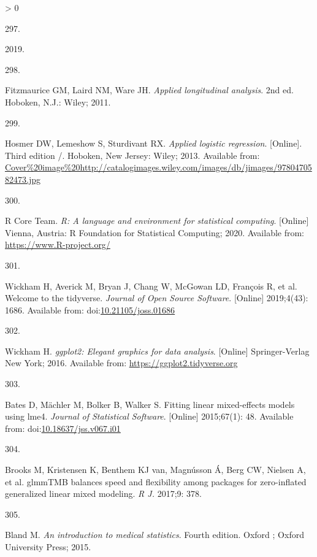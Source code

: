 \documentclass[twoside,10pt]{gihclass} %
\newlength{\cslhangindent}
\newlength{\csllabelwidth}
\newenvironment{CSLReferences}[3] %
 {%
  \setlength{\parindent}{0pt}
  \ifodd #1 \everypar{\setlength{\hangindent}{\cslhangindent}}\ignorespaces\fi
  \ifnum #2 > 0
  \setlength{\parskip}{#2\baselineskip}
  \fi
 }%
 {}
\newcommand{\CSLLeftMargin}[1]{\parbox[t]{\maxof{\widthof{#1}}{\csllabelwidth}}{#1}}
\newcommand{\CSLRightInline}[1]{\parbox[t]{\linewidth}{#1}}
\begin{document}
\begin{CSLReferences}{0}{0}
\leavevmode\hypertarget{ref-RN2822}{}%
\CSLLeftMargin{297. }
\CSLRightInline{2019. }

\leavevmode\hypertarget{ref-RN2332}{}%
\CSLLeftMargin{298. }
\CSLRightInline{Fitzmaurice GM, Laird NM, Ware JH. \emph{Applied longitudinal analysis}. 2nd ed. Hoboken, N.J.: Wiley; 2011. }

\leavevmode\hypertarget{ref-RN1998}{}%
\CSLLeftMargin{299. }
\CSLRightInline{Hosmer DW, Lemeshow S, Sturdivant RX. \emph{Applied logistic regression}. {[}Online{]}. Third edition /. Hoboken, New Jersey: Wiley; 2013. Available from: \url{Cover\%20image\%20http://catalogimages.wiley.com/images/db/jimages/9780470582473.jpg}}

\leavevmode\hypertarget{ref-rtats}{}%
\CSLLeftMargin{300. }
\CSLRightInline{R Core Team. \emph{R: A language and environment for statistical computing}. {[}Online{]} Vienna, Austria: R Foundation for Statistical Computing; 2020. Available from: \url{https://www.R-project.org/}}

\leavevmode\hypertarget{ref-tidyverse}{}%
\CSLLeftMargin{301. }
\CSLRightInline{Wickham H, Averick M, Bryan J, Chang W, McGowan LD, François R, et al. Welcome to the {tidyverse}. \emph{Journal of Open Source Software}. {[}Online{]} 2019;4(43): 1686. Available from: doi:\href{https://doi.org/10.21105/joss.01686}{10.21105/joss.01686}}

\leavevmode\hypertarget{ref-ggplot2}{}%
\CSLLeftMargin{302. }
\CSLRightInline{Wickham H. \emph{ggplot2: Elegant graphics for data analysis}. {[}Online{]} Springer-Verlag New York; 2016. Available from: \url{https://ggplot2.tidyverse.org}}

\leavevmode\hypertarget{ref-RN1819}{}%
\CSLLeftMargin{303. }
\CSLRightInline{Bates D, Mächler M, Bolker B, Walker S. Fitting linear mixed-effects models using lme4. \emph{Journal of Statistical Software}. {[}Online{]} 2015;67(1): 48. Available from: doi:\href{https://doi.org/10.18637/jss.v067.i01}{10.18637/jss.v067.i01}}

\leavevmode\hypertarget{ref-RN2626}{}%
\CSLLeftMargin{304. }
\CSLRightInline{Brooks M, Kristensen K, Benthem KJ van, Magnússon Á, Berg CW, Nielsen A, et al. glmmTMB balances speed and flexibility among packages for zero-inflated generalized linear mixed modeling. \emph{R J.} 2017;9: 378. }

\leavevmode\hypertarget{ref-RN2007}{}%
\CSLLeftMargin{305. }
\CSLRightInline{Bland M. \emph{An introduction to medical statistics}. Fourth edition. Oxford ; Oxford University Press; 2015. }


\end{CSLReferences}
\end{document}
